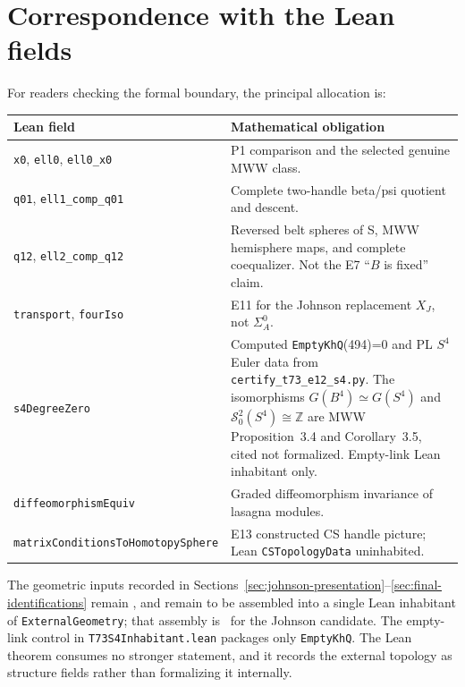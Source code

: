 \section{Correspondence with the Lean fields}\label{app:lean-fields}

For readers checking the formal boundary, the principal allocation is:
\begin{center}
\small
\begin{tabularx}{\textwidth}{@{}l X@{}}
\toprule
Lean field & Mathematical obligation \\
\midrule
\texttt{x0}, \texttt{ell0}, \texttt{ell0\_x0} & P1 comparison and the selected genuine MWW class. \\
\texttt{q01}, \texttt{ell1\_comp\_q01} & Complete two-handle beta/psi quotient and descent. \\
\texttt{q12}, \texttt{ell2\_comp\_q12} & Reversed belt spheres of S, MWW hemisphere maps, and complete coequalizer.  Not the E7 ``$B$ is fixed'' claim. \\
\texttt{transport}, \texttt{fourIso} & E11 for the Johnson replacement $X_J$, not $\Sigma_A^0$. \\
\texttt{s4DegreeZero} & Computed \texttt{EmptyKhQ}(494)=0 and PL $S^4$ Euler data from \texttt{certify\_t73\_e12\_s4.py}.  The isomorphisms $G(B^4)\simeq G(S^4)$ and $\mathcal S^2_0(S^4)\cong\mathbb Z$ are MWW Proposition~3.4 and Corollary~3.5, cited not formalized.  Empty-link Lean inhabitant only. \\
\texttt{diffeomorphismEquiv} & Graded diffeomorphism invariance of lasagna modules. \\
\texttt{matrixConditionsToHomotopySphere} & E13 constructed CS handle picture; Lean \texttt{CSTopologyData} uninhabited. \\
\bottomrule
\end{tabularx}
\end{center}

The geometric inputs recorded in Sections~\ref{sec:johnson-presentation}--\ref{sec:final-identifications}
remain \Open, and remain to be assembled into a single Lean inhabitant of
\texttt{ExternalGeometry}; that assembly is \Open\ for the Johnson candidate.
The empty-link control in \texttt{T73S4Inhabitant.lean} packages only
\texttt{EmptyKhQ}.  The Lean theorem consumes no stronger statement, and it
records the external topology as structure fields rather than formalizing it
internally.



